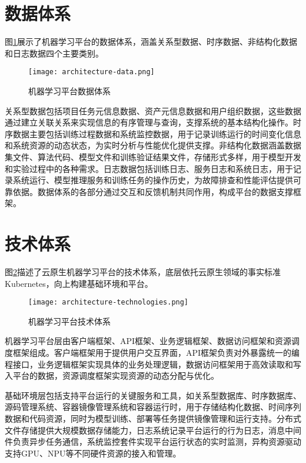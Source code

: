 \section{数据体系}

图\ref{fig:architecture-data}展示了机器学习平台的数据体系，涵盖关系型数据、时序数据、非结构化数据和日志数据四个主要类别。

\begin{figure}
  \centering
  \texttt{[image: architecture-data.png]}
  \caption{机器学习平台数据体系}
  \label{fig:architecture-data}
\end{figure}

关系型数据包括项目任务元信息数据、资产元信息数据和用户组织数据，这些数据通过建立关联关系来实现信息的有序管理与查询，支撑系统的基本结构化操作。时序数据主要包括训练过程数据和系统监控数据，用于记录训练运行的时间变化信息和系统资源的动态状态，为实时分析与性能优化提供支撑。非结构化数据涵盖数据集文件、算法代码、模型文件和训练验证结果文件，存储形式多样，用于模型开发和实验过程中的各种需求。日志数据包括训练日志、服务日志和系统日志，用于记录系统运行、模型推理服务和训练任务的操作历史，为故障排查和性能评估提供可靠依据。数据体系的各部分通过交互和反馈机制共同作用，构成平台的数据支撑框架。


\section{技术体系}

图\ref{fig:architecture-technologies}描述了云原生机器学习平台的技术体系，底层依托云原生领域的事实标准Kubernetes，向上构建基础环境和平台。

\begin{figure}
  \centering
  \texttt{[image: architecture-technologies.png]}
  \caption{机器学习平台技术体系}
  \label{fig:architecture-technologies}
\end{figure}

机器学习平台层由客户端框架、API框架、业务逻辑框架、数据访问框架和资源调度框架组成。客户端框架用于提供用户交互界面，API框架负责对外暴露统一的编程接口，业务逻辑框架实现具体的业务处理逻辑，数据访问框架用于高效读取和写入平台的数据，资源调度框架实现资源的动态分配与优化。

基础环境层包括支持平台运行的关键服务和工具，如关系型数据库、时序数据库、源码管理系统、容器镜像管理系统和容器运行时，用于存储结构化数据、时间序列数据和代码资源，同时为模型训练、部署等任务提供镜像管理和运行支持。分布式文件存储提供大规模数据存储能力，日志系统记录平台运行的行为日志，消息中间件负责异步任务通信，系统监控套件实现平台运行状态的实时监测，异构资源驱动支持GPU、NPU等不同硬件资源的接入和管理。


